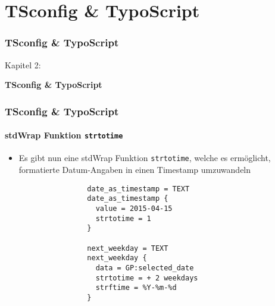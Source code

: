 %

\section{TSconfig \& TypoScript}
\begin{frame}[fragile]
	\frametitle{TSconfig \& TypoScript}

	\begin{center}\huge{Kapitel 2:}\end{center}
	\begin{center}\huge{\color{typo3darkgrey}\textbf{TSconfig \& TypoScript}}\end{center}

\end{frame}

\begin{frame}[fragile]
	\frametitle{TSconfig \& TypoScript}
	\framesubtitle{stdWrap Funktion \texttt{strtotime}}

	\begin{itemize}
		\item Es gibt nun eine stdWrap Funktion \texttt{strtotime}, welche es
			ermöglicht, formatierte Datum-Angaben in einen Timestamp umzuwandeln

			\begin{lstlisting}
				date_as_timestamp = TEXT
				date_as_timestamp {
				  value = 2015-04-15
				  strtotime = 1
				}

				next_weekday = TEXT
				next_weekday {
				  data = GP:selected_date
				  strtotime = + 2 weekdays
				  strftime = %Y-%m-%d
				}
			\end{lstlisting}

	\end{itemize}

\end{frame}

